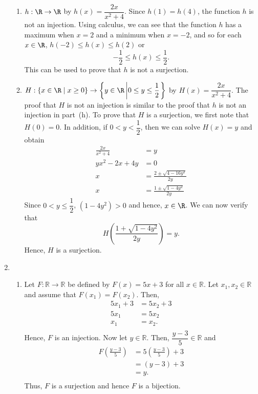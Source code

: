 \begin{enumerate}
\begin{enumerate}
\item $h: \R \to \R$ by $h(x) = \dfrac{2x}{x^2 + 4}$.  Since $h(1) = h(4)$, the function $h$ is not an injection.  Using calculus, we can see that the function $h$ has a maximum when $x = 2$ and a minimum when $x = -2$, and so for each $x \in \R$, $h(-2) \leq h(x) \leq h(2)$ or
\[
-\frac{1}{2} \leq h(x) \leq \frac{1}{2}.
\]
This can be used to prove that $h$ is not a surjection.

\item $H: \left\{ x \in \R \mid x \geq 0 \right\} \to \left\{ y \in \R \left| 0 \leq y \leq \dfrac{1}{2} \right. \right\}$ by $H(x) = \dfrac{2x}{x^2 + 4}$.  %
The proof that $H$ is not an injection is similar to the proof that $h$ is not an injection in part~(h).  To prove that $H$ is a surjection, we first note that $H(0) = 0$.  In addition, if $0 < y <\dfrac{1}{2}$, then we can solve $H(x) = y$ and obtain
\begin{align*}
\frac{2x}{x^2 + 4} &= y \\
yx^2 - 2x + 4y &= 0 \\
x &= \frac{2 \pm \sqrt{4 - 16y^2}}{2y} \\
x &= \frac{1 \pm \sqrt{1 - 4y^2}}{2y}
\end{align*}
Since $0 < y \leq \dfrac{1}{2}$, $(1 - 4y^2) > 0$ and hence, $x \in \R$.  We can now verify that
\[
H \left( \frac{1 + \sqrt{1 - 4y^2}}{2y} \right) = y.
\]
Hence, $H$ is a surjection.
\end{enumerate}



\item \begin{enumerate}
\item Let $F: \mathbb{R} \to \mathbb{R}$ be defined by $F ( x ) = 5x + 3$ for all 
$x \in \mathbb{R}$.  Let  $x_1, x_2 \in \mathbb{R}$ and assume that 
$F ( x_1 ) = F ( x_2 )$.  Then,
\[
\begin{aligned}
5x_1 + 3 &= 5x_2 + 3 \\
    5x_1 &= 5x_2 \\
     x_1 &= x_2. \\
\end{aligned}
\]
Hence, $F$ is an injection.  Now let $y \in \mathbb{R}$.  Then, $\dfrac{y - 3}{5} \in \mathbb{R}$ and 
\[
\begin{aligned}
F \left( \frac{y - 3}{5} \right) &= 5 \left( \frac{y - 3}{5} \right) + 3 \\
                         &= ( y - 3 ) + 3 \\
                         &= y. \\
\end{aligned}
\]
Thus, $F$ is a surjection and hence $F$ is a bijection.



\end{enumerate}
\end{enumerate}

